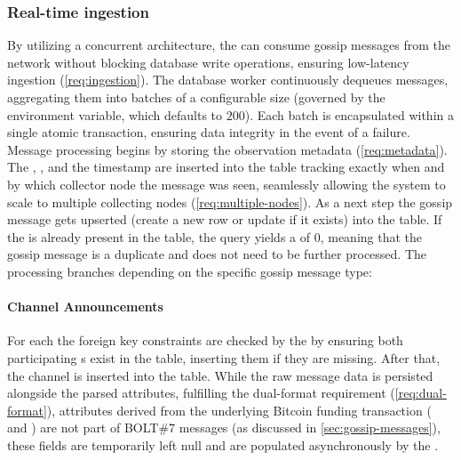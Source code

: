 \subsubsection{Real-time ingestion}
By utilizing a concurrent architecture, the  can consume gossip messages 
from the network without blocking database write operations, ensuring low-latency ingestion (\ref{req:ingestion}).
The database worker continuously dequeues messages, aggregating them into batches of a configurable size 
(governed by the  environment variable, which defaults to $200$).
Each batch is encapsulated within a single atomic transaction, ensuring data integrity in the event of a failure.
Message processing begins by storing the observation metadata (\ref{req:metadata}). 
The , , and the  
timestamp are inserted into the  table 
tracking exactly when and by which collector node the message was seen, 
seamlessly allowing the system to scale to multiple collecting nodes (\ref{req:multiple-nodes}).
As a next step the gossip message gets upserted (create a new row or update if it exists) into the  table.
If the  is already present in the table, the query yields a  of $0$, 
meaning that the gossip message is a duplicate and does not need to be further processed.
The processing branches depending on the specific gossip message type:

\paragraph{Channel Announcements}
For each  the foreign key constraints are checked by the  
by ensuring both participating s exist in the  table, inserting them if they are missing.
After that, the channel is inserted into the  table. 
While the raw message data is persisted alongside the parsed attributes, fulfilling the dual-format requirement (\ref{req:dual-format}), 
attributes derived from the underlying Bitcoin funding transaction ( and )
are not part of BOLT\#7 messages (as discussed in \autoref{sec:gossip-messages}),
these fields are temporarily left null and are populated asynchronously by the .

